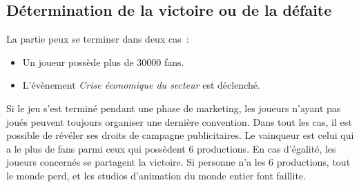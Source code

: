         \subsection{Détermination de la victoire ou de la défaite}

            La partie peux se terminer dans deux cas :
            \begin{itemize}
                \item Un joueur possède plus de 30000 fans.
                \item L'évènement \textit{Crise économique du secteur} est déclenché.
            \end{itemize}

            Si le jeu s'est terminé pendant une phase de marketing, les joueurs n'ayant pas joués peuvent toujours organiser une dernière convention.
            Dans tout les cas, il est possible de révéler ses droits de campagne publicitaires.\newline
            Le vainqueur est celui qui a le plus de fans parmi ceux qui possèdent 6 productions.
            En cas d'égalité, les joueurs concernés se partagent la victoire. Si personne n'a les 6 productions,
            tout le monde perd, et les studios d'animation du monde entier font faillite.